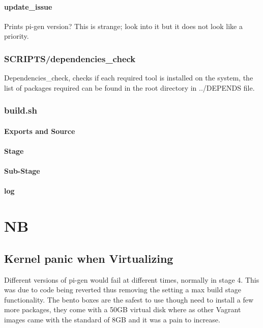 \documentclass[12pt,a4paper]{report}
\begin{document}
\subsubsection{update\_issue}
Prints pi-gen version? This is strange; look into it but it does not look like a priority. 
\subsection{SCRIPTS/dependencies\_check}
Dependencies\_check, checks if each required tool is installed on the system, the list of packages required can be found in the root directory in  ../DEPENDS file.
\subsection{build.sh}
\subsubsection{Exports and Source}
\subsubsection{Stage}

\subsubsection{Sub-Stage}


\subsubsection{log}

\chapter{NB}
\section{Kernel panic when Virtualizing}
Different versions of pi-gen would fail at different times, normally in stage 4. This was due to code being reverted thus removing the setting a max build stage functionality. The bento boxes are the safest to use though need to install a few more packages, they come with a 50GB virtual disk where as other Vagrant images came with the standard of 8GB and it was a pain to increase. 
\end{document}

